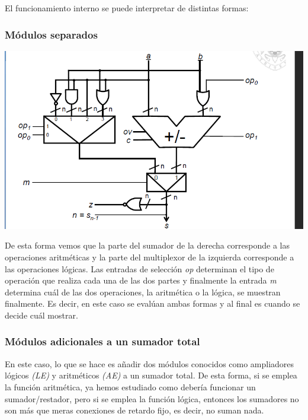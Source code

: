 \documentclass[a4paper,10pt]{book}
\begin{document}
El funcionamiento interno se puede interpretar de distintas formas:

\subsubsection*{Módulos separados}

\begin{center}
\includegraphics[scale=0.74]{ALU1}
\end{center}

De esta forma vemos que la parte del sumador de la derecha corresponde a las operaciones aritméticas y la parte del multiplexor de la izquierda corresponde a las operaciones lógicas. Las entradas de selección \textit{op} determinan el tipo de operación que realiza cada una de las dos partes y finalmente la entrada \textit{m} determina cuál de las dos operaciones, la aritmética o la lógica, se muestran finalmente. Es decir, en este caso se evalúan ambas formas y al final es cuando se decide cuál mostrar.

\subsubsection*{Módulos adicionales a un sumador total}
En este caso, lo que se hace es añadir dos módulos conocidos como ampliadores lógicos \textit{(LE)} y aritméticos \textit{(AE)} a un sumador total. De esta forma, si se emplea la función aritmética, ya hemos estudiado como debería funcionar un sumador/restador, pero si se emplea la función lógica, entonces los sumadores no son más que meras conexiones de retardo fijo, es decir, no suman nada.
\end{document}
